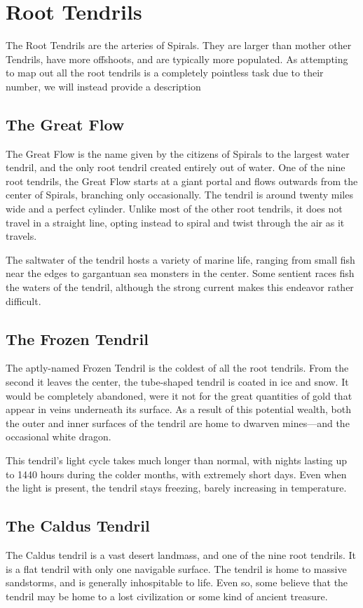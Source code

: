 \chapter{Root Tendrils}
The Root Tendrils are the arteries of Spirals.
They are larger than mother other Tendrils, have more offshoots, and are typically more populated.
As attempting to map out all the root tendrils is a completely pointless task due to their number, we will instead provide a description

\begin{multicols}{2}
\section{The Great Flow}
The Great Flow is the name given by the citizens of Spirals to the largest water tendril, and the only root tendril created entirely out of water.
One of the nine root tendrils, the Great Flow starts at a giant portal and flows outwards from the center of Spirals, branching only occasionally.
The tendril is around twenty miles wide and a perfect cylinder.
Unlike most of the other root tendrils, it does not travel in a straight line, opting instead to spiral and twist through the air as it travels.

The saltwater of the tendril hosts a variety of marine life, ranging from small fish near the edges to gargantuan sea monsters in the center.
Some sentient races fish the waters of the tendril, although the strong current makes this endeavor rather difficult.

\section{The Frozen Tendril}
The aptly-named Frozen Tendril is the coldest of all the root tendrils.
From the second it leaves the center, the tube-shaped tendril is coated in ice and snow.
It would be completely abandoned, were it not for the great quantities of gold that appear in veins underneath its surface.
As a result of this potential wealth, both the outer and inner surfaces of the tendril are home to dwarven mines---and the occasional white dragon.

This tendril's light cycle takes much longer than normal, with nights lasting up to 1440 hours during the colder months, with extremely short days.
Even when the light is present, the tendril stays freezing, barely increasing in temperature.

\section{The Caldus Tendril}
The Caldus tendril is a vast desert landmass, and one of the nine root tendrils.
It is a flat tendril with only one navigable surface.
The tendril is home to massive sandstorms, and is generally inhospitable to life.
Even so, some believe that the tendril may be home to a lost civilization or some kind of ancient treasure.


\end{multicols}
